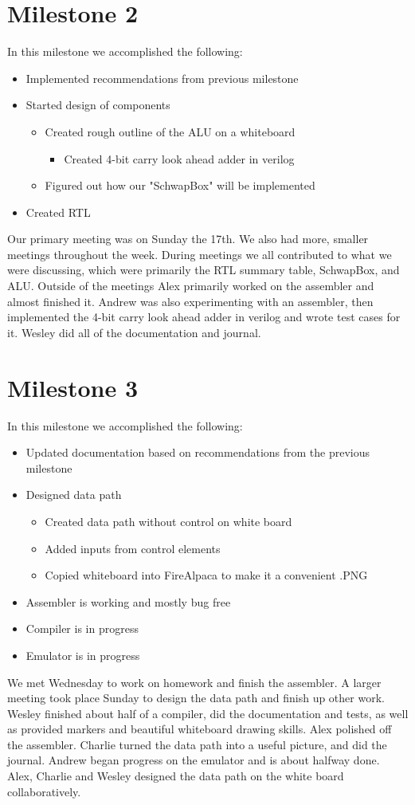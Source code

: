 \documentclass{report}
\begin{document}
	\section{Milestone 2}
		In this milestone we accomplished the following:
		\begin{itemize}
			\item Implemented recommendations from previous milestone
			\item Started design of components
			\begin{itemize}
				\item Created rough outline of the ALU on a whiteboard
				\begin{itemize}
					\item Created 4-bit carry look ahead adder in verilog
				\end{itemize}
				\item Figured out how our "SchwapBox" will be implemented
			\end{itemize}
			\item Created RTL
		\end{itemize}
		Our primary meeting was on Sunday the 17th.  We also had more, smaller meetings throughout the week.  During meetings we all contributed to what we were discussing, which were primarily the RTL summary table, SchwapBox, and ALU.  Outside of the meetings Alex primarily worked on the assembler and almost finished it.  Andrew was also experimenting with an assembler, then implemented the 4-bit carry look ahead adder in verilog and wrote test cases for it.  Wesley did all of the documentation and journal.
	\section{Milestone 3}
		In this milestone we accomplished the following:
		\begin{itemize}
			\item Updated documentation based on recommendations from the previous milestone
			\item Designed data path
			\begin{itemize}
				\item Created data path without control on white board
				\item Added inputs from control elements
				\item Copied whiteboard into FireAlpaca to make it a convenient .PNG
			\end{itemize}
			\item Assembler is working and mostly bug free
			\item Compiler is in progress
			\item Emulator is in progress
		\end{itemize}
		We met Wednesday to work on homework and finish the assembler. A larger meeting took place Sunday to design the data path and finish up other work. Wesley finished about half of a compiler, did the documentation and tests, as well as provided markers and beautiful whiteboard drawing skills. Alex polished off the assembler. Charlie turned the data path into a useful picture, and did the journal. Andrew began progress on the emulator and is about halfway done. Alex, Charlie and Wesley designed the data path on the white board collaboratively.
\end{document}
